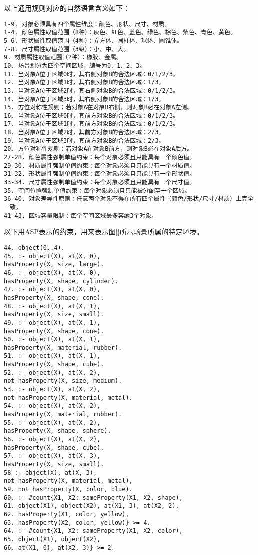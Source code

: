 以上通用规则对应的自然语言含义如下：
\begin{lstlisting}
1-9. 对象必须具有四个属性维度：颜色、形状、尺寸、材质。
1-4. 颜色属性取值范围（8种）：灰色、红色、蓝色、绿色、棕色、紫色、青色、黄色。
5-6. 形状属性取值范围（4种）：立方体、圆柱体、球体、圆锥体。
7-8. 尺寸属性取值范围（3级）：小、中、大。
9. 材质属性取值范围（2种）：橡胶、金属。
10. 场景划分为四个空间区域，编号为0、1、2、3。
11. 当对象A位于区域0时，其右侧对象B的合法区域：0/1/2/3。
12. 当对象A位于区域1时，其右侧对象B的合法区域：1/3。
13. 当对象A位于区域2时，其右侧对象B的合法区域：0/1/2/3。
14. 当对象A位于区域3时，其右侧对象B的合法区域：1/3。
15. 方位对称性规则：若对象A在对象B右侧，则对象B必在对象A左侧。
16. 当对象A位于区域0时，其前方对象B的合法区域：0/1/2/3。
17. 当对象A位于区域1时，其前方对象B的合法区域：0/1/2/3。
18. 当对象A位于区域2时，其前方对象B的合法区域：2/3。
19. 当对象A位于区域3时，其前方对象B的合法区域：2/3。
20. 方位对称性规则：若对象A在对象B前方，则对象B必在对象A后方。
27-28. 颜色属性强制单值约束：每个对象必须且只能具有一个颜色值。
29-30. 材质属性强制单值约束：每个对象必须且只能具有一个材质值。
31-32. 形状属性强制单值约束：每个对象必须且只能具有一个形状值。
33-34. 尺寸属性强制单值约束：每个对象必须且只能具有一个尺寸值。
35. 空间位置强制单值约束：每个对象必须且只能被分配至一个区域。
36-40. 对象差异性原则：任意两个对象不得在所有四个属性（颜色/形状/尺寸/材质）上完全一致。
41-43. 区域容量限制：每个空间区域最多容纳3个对象。
\end{lstlisting}
以下用ASP表示的约束，用来表示图\ref{}所示场景所属的特定环境。
\begin{lstlisting}
44. object(0..4).
45. :- object(X), at(X, 0),
hasProperty(X, size, large).
46. :- object(X), at(X, 0),
hasProperty(X, shape, cylinder).
47. :- object(X), at(X, 0),
hasProperty(X, shape, cone).
48. :- object(X), at(X, 1),
hasProperty(X, size, small).
49. :- object(X), at(X, 1),
hasProperty(X, shape, cone).
50. :- object(X), at(X, 1),
hasProperty(X, material, rubber).
51. :- object(X), at(X, 1),
hasProperty(X, shape, cube).
52. :- object(X), at(X, 2),
not hasProperty(X, size, medium).
53. :- object(X), at(X, 2),
not hasProperty(X, material, metal).
54. :- object(X), at(X, 2),
hasProperty(X, material, rubber).
55. :- object(X), at(X, 2),
hasProperty(X, shape, sphere).
56. :- object(X), at(X, 2),
hasProperty(X, shape, cube).
57. :- object(X), at(X, 3),
hasProperty(X, size, small).
58 :- object(X), at(X, 3),
not hasProperty(X, material, metal),
59. not hasProperty(X, color, blue).
60. :- #count{X1, X2: sameProperty(X1, X2, shape),
61. object(X1), object(X2), at(X1, 3), at(X2, 2),
62. hasProperty(X1, color, yellow),
63. hasProperty(X2, color, yellow)} >= 4.
64. :- #count{X1, X2: sameProperty(X1, X2, color),
65. object(X1), object(X2),
66. at(X1, 0), at(X2, 3)} >= 2.
\end{lstlisting}
